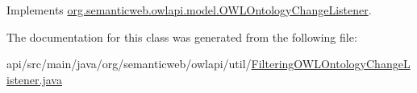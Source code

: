 Implements \hyperlink{interfaceorg_1_1semanticweb_1_1owlapi_1_1model_1_1_o_w_l_ontology_change_listener_a1b799247b850f5731783b5b7167a8642}{org.\-semanticweb.\-owlapi.\-model.\-O\-W\-L\-Ontology\-Change\-Listener}.



The documentation for this class was generated from the following file\-:\begin{DoxyCompactItemize}
\item 
api/src/main/java/org/semanticweb/owlapi/util/\hyperlink{_filtering_o_w_l_ontology_change_listener_8java}{Filtering\-O\-W\-L\-Ontology\-Change\-Listener.\-java}\end{DoxyCompactItemize}
